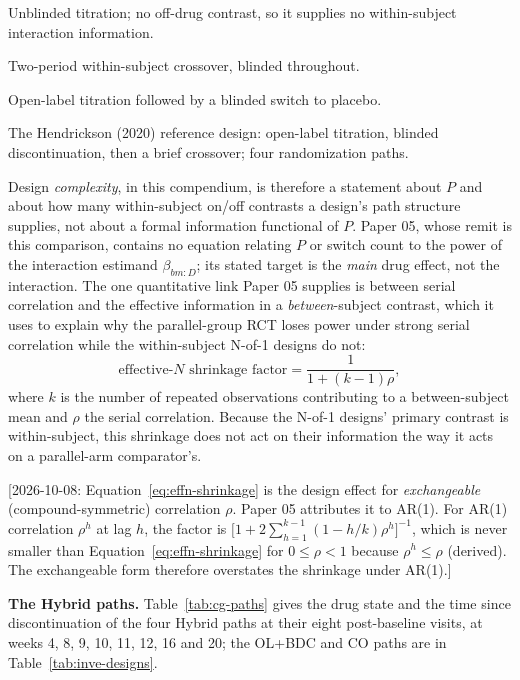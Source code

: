 \documentclass[11pt]{article}
\newcommand{\note}[1]{\textcolor{blue!60!black}{\small [#1]}}
\begin{document}
\begin{description}[leftmargin=2em]
\item[OL (open-label).] Unblinded titration; no off-drug contrast, so
  it supplies no within-subject interaction information.
\item[CO (crossover).] Two-period within-subject crossover, blinded
  throughout.
\item[OL+BDC (blinded discontinuation).] Open-label titration followed
  by a blinded switch to placebo.
\item[Hybrid.] The Hendrickson (2020) reference design: open-label
  titration, blinded discontinuation, then a brief crossover; four
  randomization paths.
\end{description}

Design \emph{complexity}, in this compendium, is therefore a
statement about $P$ and about how many within-subject on/off contrasts
a design's path structure supplies, not about a formal information
functional of $P$. Paper 05, whose remit is this comparison, contains
no equation relating $P$ or switch count to the power of the
interaction estimand $\beta_{bm:D}$; its stated target is the
\emph{main} drug effect, not the interaction. The one quantitative
link Paper 05 supplies is between serial correlation and the
effective information in a \emph{between}-subject contrast, which it
uses to explain why the parallel-group RCT loses power under strong
serial correlation while the within-subject N-of-1 designs do not:
\begin{equation}
\text{effective-$N$ shrinkage factor} = \frac{1}{1 + (k-1)\rho},
\label{eq:effn-shrinkage}
\end{equation}
where $k$ is the number of repeated observations contributing to a
between-subject mean and $\rho$ the serial correlation. Because the
N-of-1 designs' primary contrast is within-subject, this shrinkage
does not act on their information the way it acts on a parallel-arm
comparator's.

\note{2026-10-08: Equation~\eqref{eq:effn-shrinkage} is the design
effect for \emph{exchangeable} (compound-symmetric) correlation $\rho$.
Paper 05 attributes it to AR(1). For AR(1) correlation $\rho^h$ at
lag $h$, the factor is
$\big[1 + 2\sum_{h=1}^{k-1}(1 - h/k)\rho^h\big]^{-1}$, which is never
smaller than Equation~\eqref{eq:effn-shrinkage} for $0 \le \rho < 1$
because $\rho^h \le \rho$ (derived). The exchangeable form therefore
overstates the shrinkage under AR(1).}

\textbf{The Hybrid paths.} Table~\ref{tab:cg-paths} gives the drug
state and the time since discontinuation of the four Hybrid paths at
their eight post-baseline visits, at weeks 4, 8, 9, 10, 11, 12, 16 and
20; the OL+BDC and CO paths are in Table~\ref{tab:inve-designs}.
\end{document}
